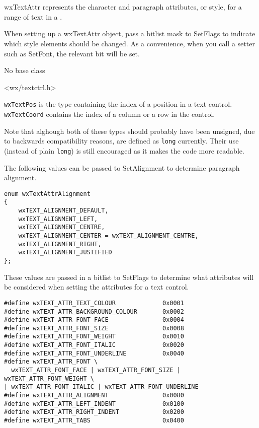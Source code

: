
\section{}\label{wxtextattr}

wxTextAttr represents the character and paragraph attributes, or style, for a range of text in a\rtfsp
{}.

When setting up a wxTextAttr object, pass a bitlist mask to SetFlags to indicate
which style elements should be changed. As a convenience, when you call a
setter such as SetFont, the relevant bit will be set.


No base class


<wx/textctrl.h>


\texttt{wxTextPos} is the type containing the index of a position in a text
control. \texttt{wxTextCoord} contains the index of a column or a row in the
control.

Note that alghough both of these types should probably have been unsigned, due
to backwards compatibility reasons, are defined as \texttt{long} currently.
Their use (instead of plain \texttt{long}) is still encouraged as it makes the
code more readable.


The following values can be passed to SetAlignment to determine
paragraph alignment.

{\small
\begin{verbatim}
enum wxTextAttrAlignment
{
    wxTEXT_ALIGNMENT_DEFAULT,
    wxTEXT_ALIGNMENT_LEFT,
    wxTEXT_ALIGNMENT_CENTRE,
    wxTEXT_ALIGNMENT_CENTER = wxTEXT_ALIGNMENT_CENTRE,
    wxTEXT_ALIGNMENT_RIGHT,
    wxTEXT_ALIGNMENT_JUSTIFIED
};
\end{verbatim}
}

These values are passed in a bitlist to SetFlags to determine
what attributes will be considered when setting the attributes
for a text control.

{\small
\begin{verbatim}
#define wxTEXT_ATTR_TEXT_COLOUR             0x0001
#define wxTEXT_ATTR_BACKGROUND_COLOUR       0x0002
#define wxTEXT_ATTR_FONT_FACE               0x0004
#define wxTEXT_ATTR_FONT_SIZE               0x0008
#define wxTEXT_ATTR_FONT_WEIGHT             0x0010
#define wxTEXT_ATTR_FONT_ITALIC             0x0020
#define wxTEXT_ATTR_FONT_UNDERLINE          0x0040
#define wxTEXT_ATTR_FONT \
  wxTEXT_ATTR_FONT_FACE | wxTEXT_ATTR_FONT_SIZE | wxTEXT_ATTR_FONT_WEIGHT \
| wxTEXT_ATTR_FONT_ITALIC | wxTEXT_ATTR_FONT_UNDERLINE
#define wxTEXT_ATTR_ALIGNMENT               0x0080
#define wxTEXT_ATTR_LEFT_INDENT             0x0100
#define wxTEXT_ATTR_RIGHT_INDENT            0x0200
#define wxTEXT_ATTR_TABS                    0x0400
\end{verbatim}
}

